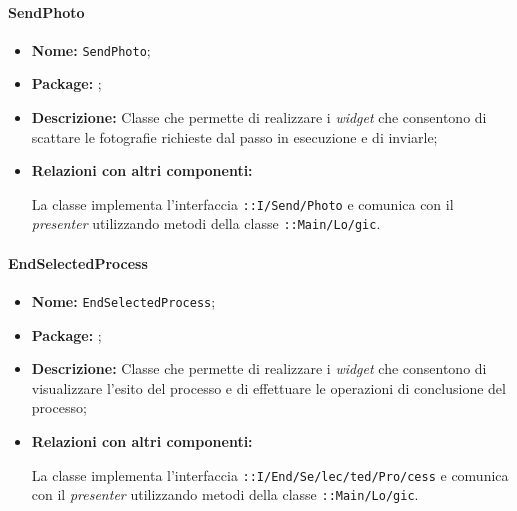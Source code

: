 \paragraph{SendPhoto}
\begin{flushleft}
\begin{itemize}
\item \textbf{Nome:} \texttt{SendPhoto};
\item \textbf{Package:} \texttt{\viewUser{}};
\item \textbf{Descrizione:} Classe che permette di realizzare i \textit{widget} che consentono di scattare le fotografie richieste dal passo in esecuzione e di inviarle;
\item \textbf{Relazioni con altri componenti:}
\begin{sloppypar}
La classe implementa l'interfaccia \texttt{\iViewUser{}::I\fshyp{}Send\fshyp{}Photo} e comunica con il \textit{presenter} utilizzando metodi della classe \texttt{\logicUser{}::Main\fshyp{}Lo\fshyp{}gic}.
\end{sloppypar}
\end{itemize}
\end{flushleft}

\paragraph{EndSelectedProcess}
\begin{flushleft}
\begin{itemize}
\item \textbf{Nome:} \texttt{EndSelectedProcess};
\item \textbf{Package:} \texttt{\viewUser{}};
\item \textbf{Descrizione:} Classe che permette di realizzare i \textit{widget} che consentono di visualizzare l'esito del processo e di effettuare le operazioni di conclusione del processo;
\item \textbf{Relazioni con altri componenti:}
\begin{sloppypar}
La classe implementa l'interfaccia \texttt{\iViewUser{}::I\fshyp{}End\fshyp{}Se\fshyp{}lec\fshyp{}ted\fshyp{}Pro\fshyp{}cess} e comunica con il \textit{presenter} utilizzando metodi della classe \texttt{\logicUser{}::Main\fshyp{}Lo\fshyp{}gic}.
\end{sloppypar}
\end{itemize}
\end{flushleft}

